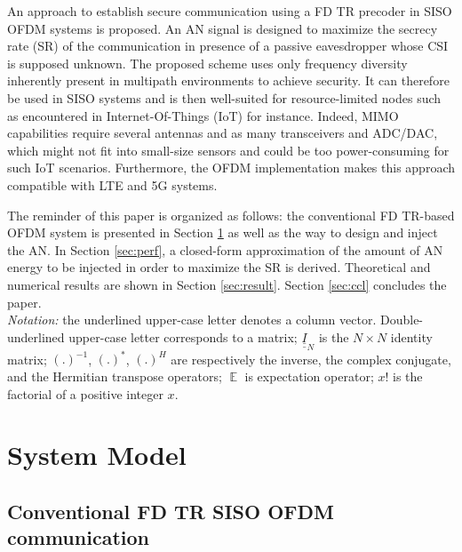 \documentclass[a4paper,11pt]{article}
\def\uu#1{\underline{\underline{#1}}}
\begin{document}
An approach to establish secure communication using a FD TR precoder in SISO OFDM systems is proposed. An AN signal is designed to maximize the secrecy rate (SR) of the communication in presence of a passive eavesdropper whose CSI is supposed unknown. The proposed scheme uses only frequency diversity inherently present in multipath environments to achieve security. It can therefore be used in SISO systems and is then well-suited for resource-limited nodes such as encountered in Internet-Of-Things (IoT) for instance.  Indeed, MIMO capabilities require several antennas and as many transceivers and ADC/DAC, which might not fit into small-size sensors and could  be too power-consuming for such IoT scenarios. Furthermore, the OFDM implementation makes this approach compatible with LTE and 5G systems.

The reminder of this paper is organized as follows: the conventional FD TR-based OFDM system is presented in Section \ref{sec:model} as well as the way to design and inject the AN. In Section \ref{sec:perf}, a closed-form approximation of the amount of AN energy to be injected in order to maximize the SR is derived. Theoretical and numerical results are shown in Section \ref{sec:result}. Section \ref{sec:ccl} concludes the paper. \\
\textit{Notation:} the underlined upper-case letter denotes a column vector. Double-underlined upper-case letter corresponds to a matrix; $\uu{I}_N$ is the $N\times N$ identity matrix; $\left(.\right)^{-1}$, $\left( . \right)^*$, $\left(.\right)^H$ are respectively the inverse, the complex conjugate, and the Hermitian transpose operators; $\mathop{\mathbb{E}}$ is expectation operator; $x!$ is the factorial of a positive integer $x$.




\section{System Model}
\label{sec:model}
\subsection{Conventional FD TR SISO OFDM communication}
\label{subsec:traditional_FDTR}
\end{document}
